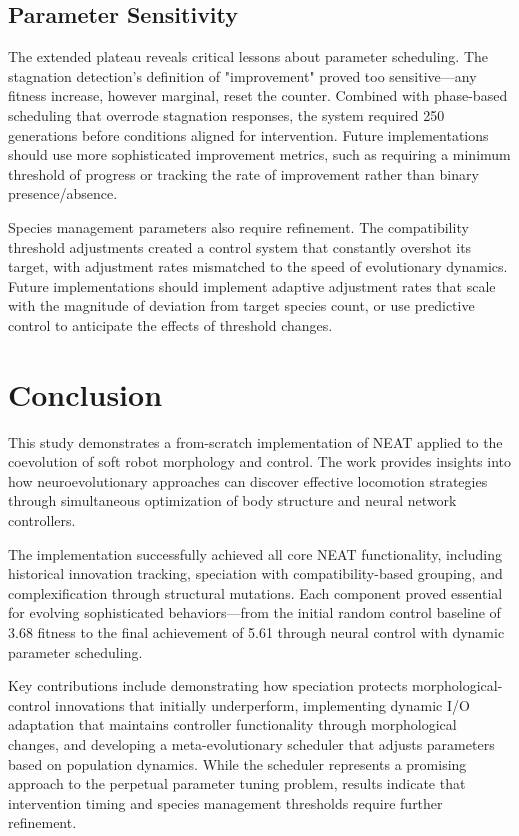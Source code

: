 \documentclass[conference]{IEEEtran}
\begin{document}
\subsection{Parameter Sensitivity}
The extended plateau reveals critical lessons about parameter scheduling. The stagnation detection's definition of "improvement" proved too sensitive—any fitness increase, however marginal, reset the counter. Combined with phase-based scheduling that overrode stagnation responses, the system required 250 generations before conditions aligned for intervention. Future implementations should use more sophisticated improvement metrics, such as requiring a minimum threshold of progress or tracking the rate of improvement rather than binary presence/absence.

Species management parameters also require refinement. The compatibility threshold adjustments created a control system that constantly overshot its target, with adjustment rates mismatched to the speed of evolutionary dynamics. Future implementations should implement adaptive adjustment rates that scale with the magnitude of deviation from target species count, or use predictive control to anticipate the effects of threshold changes.

\section{Conclusion}
This study demonstrates a from-scratch implementation of NEAT applied to the coevolution of soft robot morphology and control. The work provides insights into how neuroevolutionary approaches can discover effective locomotion strategies through simultaneous optimization of body structure and neural network controllers.

The implementation successfully achieved all core NEAT functionality, including historical innovation tracking, speciation with compatibility-based grouping, and complexification through structural mutations. Each component proved essential for evolving sophisticated behaviors—from the initial random control baseline of 3.68 fitness to the final achievement of 5.61 through neural control with dynamic parameter scheduling.

Key contributions include demonstrating how speciation protects morphological-control innovations that initially underperform, implementing dynamic I/O adaptation that maintains controller functionality through morphological changes, and developing a meta-evolutionary scheduler that adjusts parameters based on population dynamics. While the scheduler represents a promising approach to the perpetual parameter tuning problem, results indicate that intervention timing and species management thresholds require further refinement.
\end{document}
